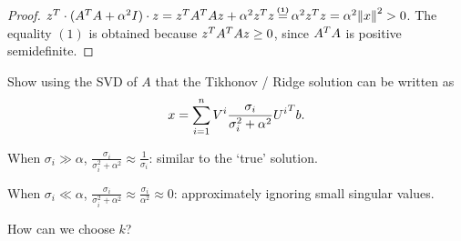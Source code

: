 \documentclass[computational_mathematics.tex]{subfiles}
\begin{document}
\begin{proof}
  $\tr{z} \cdot (\tr{A}A + \alpha^2 I) \cdot z = \tr{z}\tr{A}Az + \alpha^2 \tr{z} z  \numeq{(1)} \alpha^2 \tr{z} z = \alpha^2 \sqrnorm{x} > 0$. The equality $(1)$ is obtained because ${z}^{T}{A}^{T}Az \ge 0$, since ${A}^{T}A$ is positive semidefinite. 
\end{proof}

\begin{exe}
Show using the SVD of $A$ that the Tikhonov / Ridge solution can be written as
\[
  x = \sum\limits_{i=1}^n V^i \frac{\sigma_i}{\sigma_i^2+\alpha^2} {U^i}^{T} b.
\]

When $\sigma_i \gg \alpha$, $\frac{\sigma_i}{\sigma_i^2+\alpha^2} \approx \frac{1}{\sigma_i}$: similar to the `true' solution.

When $\sigma_i \ll \alpha$, $\frac{\sigma_i}{\sigma_i^2+\alpha^2} \approx \frac{\sigma_i}{\alpha^2} \approx 0$: approximately ignoring small singular values.
\end{exe}
How can we choose $k$?

\end{document}

